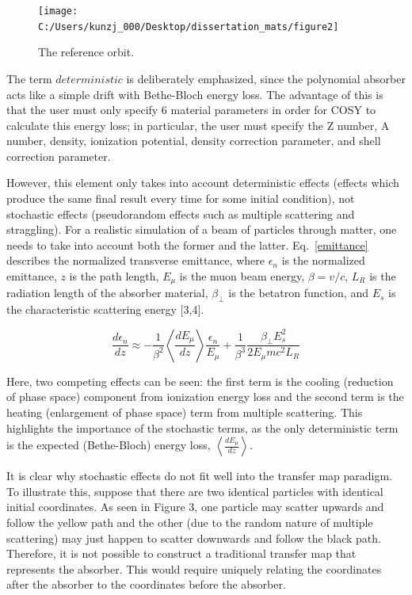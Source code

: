 \documentclass{jacow}
\begin{document}
\begin{figure}[h!]
\centering
\texttt{[image: C:/Users/kunzj\_000/Desktop/dissertation\_mats/figure2]}
\caption{The reference orbit.}
\end{figure}

The term $deterministic$ is deliberately emphasized, since the polynomial absorber acts like a simple drift with Bethe-Bloch energy loss. The advantage of this is that the user must only specify 6 material parameters in order for COSY to calculate this energy loss; in particular, the user must specify the Z number, A number, density, ionization potential, density correction parameter, and shell correction parameter. \par

However, this element only takes into account deterministic effects (effects which produce the same final result every time for some initial condition), not stochastic effects (pseudorandom effects such as multiple scattering and straggling). For a realistic simulation of a beam of particles through matter, one needs to take into account both the former and the latter. Eq.~\eqref{emittance} describes the normalized transverse emittance, where $\epsilon_n$ is the normalized emittance, $z$ is the path length, $E_\mu$ is the muon beam energy, $\beta = v/c$, $L_R$ is the radiation length of the absorber material, $\beta_\perp$ is the betatron function, and $E_s$ is the characteristic scattering energy [3,4].

\begin{equation}
\frac{d\epsilon_n }{dz} \approx -\frac{1}{\beta^2} \left< \frac{dE_\mu}{dz} \right> \frac{\epsilon_n}{E_\mu} + \frac{1}{\beta^3} \frac{\beta_\perp E_s ^2}{2E_\mu mc^2 L_R}
\label{emittance}
\end{equation}

Here, two competing effects can be seen: the first term is the cooling (reduction of phase space) component from ionization energy loss and the second term is the heating (enlargement of phase space) term from multiple scattering. This highlights the importance of the stochastic terms, as the only deterministic term is the expected (Bethe-Bloch) energy loss, $\left< \frac{dE_\mu}{dz} \right>$. \par

It is clear why stochastic effects do not fit well into the transfer map paradigm. To illustrate this, suppose that there are two identical particles with identical initial coordinates. As seen in Figure 3, one particle may scatter upwards and follow the yellow path and the other (due to the random nature of multiple scattering) may just happen to scatter downwards and follow the black path. Therefore, it is not possible to construct a traditional transfer map that represents the absorber. This would require uniquely relating the coordinates after the absorber to the coordinates before the absorber. \par
\end{document}
